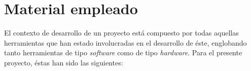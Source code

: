 \documentclass[12pt,a4paper, twoside]{report}
\makeatletter
\newcommand{\blankpage}{
				\newpage
				\thispagestyle{empty}
				\mbox{}
				\newpage
				}
\let\plainappendixpage\appendixpage
\renewcommand{\appendixpage}{%
  \begingroup
  \let\ps@plain\ps@empty
  \plainappendixpage
  \endgroup}
\makeatother
\begin{document}
	
			
	\thispagestyle{empty}
			
	\renewcommand{\appendixname}{Anexo}
	\renewcommand{\appendixtocname}{Anexos}
	\renewcommand{\appendixpagename}{ANEXOS} 
	\appendix 
	\addappheadtotoc 
	\appendixpage 
	
	\blankpage
		
	\chapter{Material empleado}\label{tools}
	
	El contexto de desarrollo de un proyecto está compuesto por todas aquellas herramientas que han estado involucradas en el desarrollo de éste, englobando tanto herramientas de tipo \textit{software} como de tipo \textit{hardware}. Para el presente proyecto, éstas han sido las siguientes:
\end{document}
